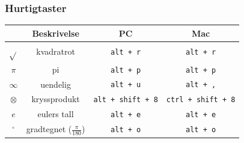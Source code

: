 \subsubsection{Hurtigtaster}
\begin{tabular}{@{}c | c |c | c }
	&\textbf{Beskrivelse} & \textbf{PC }& \textbf{Mac} \\ \hline
	$ \sqrt{} $	& kvadratrot& \texttt{alt\,+\,r} &\texttt{alt\,+\,r} \\\hline
	$ \pi $	& pi& \texttt{alt\,+\,p} & \texttt{alt\,+\,p}\\\hline
	$ \infty $ &uendelig& \texttt{alt\,+\,u} &\texttt{alt\,+\,,}  \\\hline
	$ \otimes $&kryssprodukt & \texttt{alt\,+\,shift\,+\,8}&\texttt{ctrl\,+\,shift\,+\,8} \\\hline
	$ e $&eulers tall & \texttt{alt\,+\,e}& \texttt{alt\,+\,e}\\\hline
	$ {}^\circ $&gradtegnet ($ \frac{\pi}{180} $) & \texttt{alt\,+\,o}& \texttt{alt\,+\,o}
	\\\hline	
\end{tabular}
\newpage
